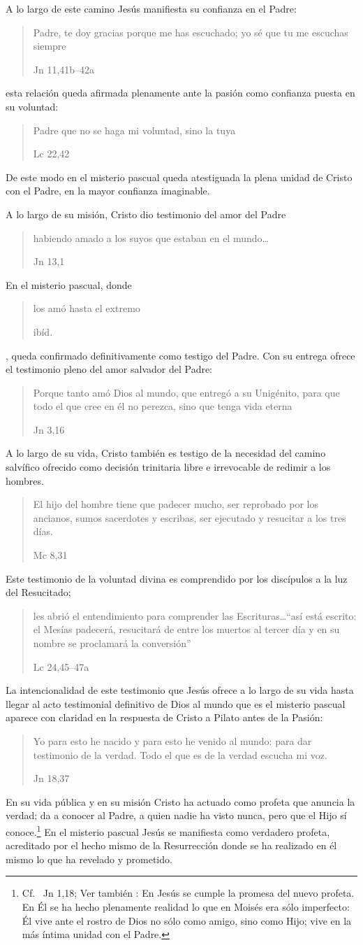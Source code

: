 A lo largo de este camino Jesús manifiesta su confianza en el Padre: \blockquote[Jn 11,41b--42a]{Padre, te doy gracias porque me has escuchado; yo sé que tu me escuchas siempre}; esta relación queda afirmada plenamente ante la pasión como confianza puesta en su voluntad: \blockquote[Lc 22,42]{Padre \textelp{} que no se haga mi voluntad, sino la tuya}. De este modo en el misterio pascual queda atestiguada la plena unidad de Cristo con el Padre, en la mayor confianza imaginable.\autocite[Cf.~][127]{prades2015testimonio}

A lo largo de su misión, Cristo dio testimonio del amor del Padre \blockquote[Jn 13,1]{habiendo amado a los suyos que estaban en el mundo\ldots}. En el misterio pascual, donde \blockquote[ibíd.]{los amó hasta el extremo}, queda confirmado definitivamente como testigo del Padre. Con su entrega ofrece el testimonio pleno del amor salvador del Padre: \blockquote[Jn 3,16]{Porque tanto amó Dios al mundo, que entregó a su Unigénito, para que todo el que cree en él no perezca, sino que tenga vida eterna}.

A lo largo de su vida, Cristo también es testigo de la necesidad del camino salvífico ofrecido como decisión trinitaria libre e irrevocable de redimir a los hombres\autocite[Cf.~][128]{prades2015testimonio}. \blockquote[Mc 8,31]{El hijo del hombre tiene que padecer mucho, ser reprobado por los ancianos, sumos sacerdotes y escribas, ser ejecutado y resucitar a los tres días.} Este testimonio de la voluntad divina es comprendido por los discípulos a la luz del Resucitado; \blockquote[Lc 24,45--47a]{les abrió el entendimiento para comprender las Escrituras\ldots \enquote{así está escrito: el Mesías padecerá, resucitará de entre los muertos al tercer día y en su nombre se proclamará la conversión}}.

La intencionalidad de este testimonio que Jesús ofrece a lo largo de su vida hasta llegar al acto testimonial definitivo de Dios al mundo que es el misterio pascual aparece con claridad en la respuesta de Cristo a Pilato antes de la Pasión: \blockquote[Jn 18,37]{Yo para esto he nacido y para esto he venido al mundo: para dar testimonio de la verdad. Todo el que es de la verdad escucha mi voz.} En su vida pública y en su misión Cristo ha actuado como profeta que anuncia la verdad; da a conocer al Padre, a quien nadie ha visto nunca, pero que el Hijo sí conoce.\footnote{Cf.~ Jn 1,18; Ver también \cite[28]{ratzinger2007jdenaz}: En Jesús se cumple la promesa del nuevo profeta. En Él se ha hecho plenamente realidad lo que en Moisés era sólo imperfecto: Él vive ante el rostro de Dios no sólo como amigo, sino como Hijo; vive en la más íntima unidad con el Padre.} En el misterio pascual Jesús se manifiesta como verdadero profeta, acreditado por el hecho mismo de la Resurrección donde se ha realizado en él mismo lo que ha revelado y prometido.\autocite[128]{prades2015testimonio}

